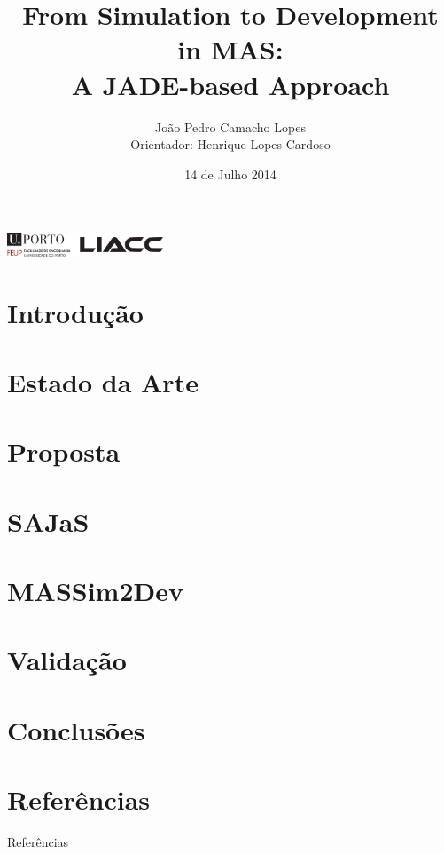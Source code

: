 \documentclass[xcolor=x11names,compress]{beamer}
\title{\texorpdfstring{From Simulation to Development in MAS:\\
		A JADE-based Approach}{}}
\author{\texorpdfstring{João Pedro Camacho Lopes\\
		Orientador: Henrique Lopes Cardoso}{}}
\renewcommand{\(}{\begin{columns}}
\renewcommand{\)}{\end{columns}}
\newcommand{\<}[1]{\begin{column}{#1}}
\renewcommand{\>}{\end{column}}
\begin{document}
\begin{frame}
\includegraphics[height=0.7cm]{figures/uporto-feup.pdf}\\

\vspace{1cm}

\date{14 de Julho 2014}
\titlepage
\end{frame}

\section{Introdução}


\section{Estado da Arte}


\section{Proposta}


\section{SAJaS}


\section{MASSim2Dev}


\section{Validação}


\section{Conclusões}


\section{Referências}
\begin{frame}{Referências}


\end{frame}
\end{document}
